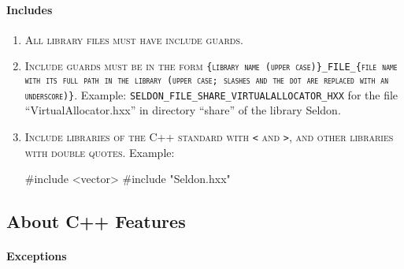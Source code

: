 \documentclass{tufte-book}
\newcounter{points}
\newcommand{\code}[1]{\texttt{#1}}
\renewcommand{\rule}[1]{\textsc{#1}}
\newcommand{\commentcs}[1]{\newline #1}
\newenvironment{cenumerate}
{
  \begin{enumerate}\setcounter{enumi}{\value{points}}%
  }
  {
    \setcounter{points}{\value{enumi}}\end{enumerate}
}
\begin{document}
\paragraph{Includes}

\begin{cenumerate}
\item \rule{All library files must have include guards.}
\item \rule{Include guards must be in the form \code{\{library name (upper
      case)\}\_FILE\_\{file name with its full path in the library (upper
      case; slashes and the dot are replaced with an underscore)\}}.}
  \commentcs{Example: \code{SELDON\_FILE\_SHARE\_VIRTUALALLOCATOR\_HXX} for the
    file ``VirtualAllocator.hxx'' in directory ``share'' of the library
    Seldon.}
\item \rule{Include libraries of the C++ standard with \code{<} and \code{>},
    and other libraries with double quotes.} \commentcs{Example:}
\begin{frame_cpp}
#include <vector>
#include "Seldon.hxx"
\end{frame_cpp}
\end{cenumerate}


\subsection{About C++ Features}

\paragraph{Exceptions}
\end{document}
